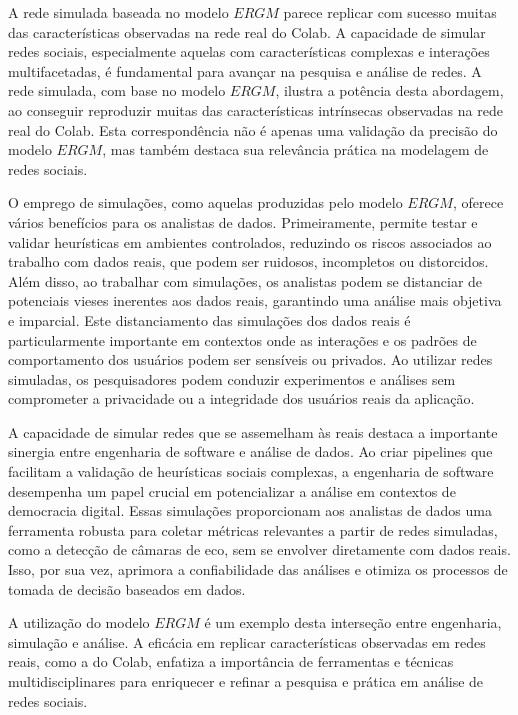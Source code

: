 A rede simulada baseada no modelo $ERGM$ parece replicar com sucesso muitas das características observadas na rede real do Colab. A capacidade de simular redes sociais, especialmente aquelas com características complexas e interações multifacetadas, é fundamental para avançar na pesquisa e análise de redes. A rede simulada, com base no modelo $ERGM$, ilustra a potência desta abordagem, ao conseguir reproduzir muitas das características intrínsecas observadas na rede real do Colab. Esta correspondência não é apenas uma validação da precisão do modelo $ERGM$, mas também destaca sua relevância prática na modelagem de redes sociais.

O emprego de simulações, como aquelas produzidas pelo modelo $ERGM$, oferece vários benefícios para os analistas de dados. Primeiramente, permite testar e validar heurísticas em ambientes controlados, reduzindo os riscos associados ao trabalho com dados reais, que podem ser ruidosos, incompletos ou distorcidos. Além disso, ao trabalhar com simulações, os analistas podem se distanciar de potenciais vieses inerentes aos dados reais, garantindo uma análise mais objetiva e imparcial. Este distanciamento das simulações dos dados reais é particularmente importante em contextos onde as interações e os padrões de comportamento dos usuários podem ser sensíveis ou privados. Ao utilizar redes simuladas, os pesquisadores podem conduzir experimentos e análises sem comprometer a privacidade ou a integridade dos usuários reais da aplicação.

A capacidade de simular redes que se assemelham às reais destaca a importante sinergia entre engenharia de software e análise de dados. Ao criar pipelines que facilitam a validação de heurísticas sociais complexas, a engenharia de software desempenha um papel crucial em potencializar a análise em contextos de democracia digital. Essas simulações proporcionam aos analistas de dados uma ferramenta robusta para coletar métricas relevantes a partir de redes simuladas, como a detecção de câmaras de eco, sem se envolver diretamente com dados reais. Isso, por sua vez, aprimora a confiabilidade das análises e otimiza os processos de tomada de decisão baseados em dados.

A utilização do modelo $ERGM$ é um exemplo desta interseção entre engenharia, simulação e análise. A eficácia em replicar características observadas em redes reais, como a do Colab, enfatiza a importância de ferramentas e técnicas multidisciplinares para enriquecer e refinar a pesquisa e prática em análise de redes sociais.

